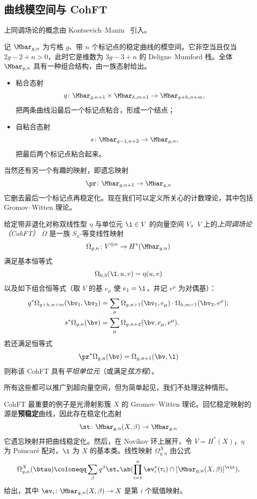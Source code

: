 \subsection{曲线模空间与 CohFT}%
\label{sub:Moduli of curves and CohFTs}

上同调场论的概念由 Kontsevich--Manin~\cite{KM1994} 引入。

记 $\Mbar_{g,n}$ 为亏格 $g$、带 $n$ 个标记点的稳定曲线的模空间。它非空当且仅当 $2g-2+n > 0$，此时它是维数为 $3g-3+n$ 的 Deligne--Mumford 栈。全体 $\Mbar_{g,n}$ 具有一种组合结构，由一族态射给出。
\begin{itemize}
    \item 粘合态射
        \[q \colon \Mbar_{g,n+1} \times \Mbar_{h, m+1} \to \Mbar_{g+h,n+m}, \]
        把两条曲线沿最后一个标记点粘合，形成一个结点；
    \item 自粘合态射 \[s \colon \Mbar_{g-1,n+2} \to \Mbar_{g,n},\]
        把最后两个标记点粘合起来。
\end{itemize}
当然还有另一个有趣的映射，即遗忘映射
\[ \pr \colon \Mbar_{g,n+1} \to \Mbar_{g,n} \]
它删去最后一个标记点再稳定化。现在我们可以定义所关心的计数理论，其中包括 Gromov--Witten 理论。

\begin{defn}
    给定带非退化对称双线性型 $\eta$ 与单位元 $\1 \in V$ 的向量空间 $V$，$V$ 上的\textit{上同调场论（CohFT）} $\Omega$ 是一族 $S_n$-等变线性映射
    \[ \Omega_{g,n} \colon V^{\otimes n} \to H^*(\Mbar_{g,n}) \]
    满足基本恒等式
    \[ \Omega_{0,3}(\1, u,v) = \eta(u,v) \]
    以及如下组合恒等式（取 $V$ 的基 $e_{\mu}$ 使 $e_1 = \1$，并记 $e^{\mu}$ 为对偶基）：
    \begin{align*}
        q^* \Omega_{g+h,n+m}(\bv_1, \bv_2) &= \sum_{\mu} \Omega_{g,n+1}(\bv_1, e_{\mu}) \cdot \Omega_{h,m+1}(  \bv_2, e^{\mu} ); \\
        s^* \Omega_{g,n}(\bv) &= \sum_{\mu} \Omega_{g,n+2}(\bv, e_{\mu}, e^{\mu}).
    \end{align*}
    若还满足恒等式
    \[ \pr^*\Omega_{g,n}(\bv) = \Omega_{g,n+1}(\bv,\1) \]
    则称该 CohFT 具有\textit{平坦单位元}（或满足\textit{弦方程}）。
\end{defn}
所有这些都可以推广到超向量空间，但为简单起见，我们不处理这种情形。

\begin{exm}
    CohFT 最重要的例子是光滑射影簇 $X$ 的 Gromov--Witten 理论。回忆稳定映射的源是\textbf{预稳定}曲线，因此存在稳定化态射
    \[ \st \colon \Mbar_{g,n}(X,\beta) \to \Mbar_{g,n} \]
    它遗忘映射并把曲线稳定化。然后，在 Novikov 环上展开，令 $V = H^*(X)$，$\eta$ 为 Poincar\'e 配对，$\1$ 为 $X$ 的基本类。线性映射 $\Omega^X_{g,n}$ 由公式
    \[ \Omega_{g,n}^X(\btau) \coloneqq \sum_{\beta} q^{\beta} \st_* \ab(\prod_{i=1}^n \ev_i^*(\tau_i) \cap [\Mbar_{g,n}(X,\beta)]^{\vir}), \]
    给出，其中 $\ev_i \colon \Mbar_{g,n}(X,\beta) \to X$ 是第 $i$ 个赋值映射。
\end{exm}

